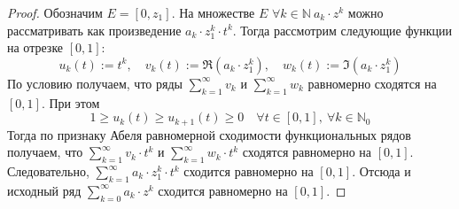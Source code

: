 \documentclass[11pt]{article}
\begin{document}
\begin{proof}
    Обозначим $E = [0, z_1]$. На множестве $E$ $\forall k \in \mathbb{N} \ a_k \cdot z^k$ можно рассматривать как произведение $a_k \cdot z_1^k \cdot t^k$. Тогда рассмотрим 
    следующие функции на отрезке $[0, 1]$: \[u_k(t) := t^k, \quad v_k(t) := \Re (a_k \cdot z_1^k), \quad w_k(t) := \Im (a_k \cdot z_1^k)\]
    По условию получаем, что ряды $\displaystyle \sum_{k = 1}^{\infty} v_k$ и $\displaystyle \sum_{k = 1}^{\infty} w_k$ равномерно сходятся на $[0, 1]$. При этом \[1 \geq u_k(t)
    \geq u_{k+1}(t) \geq 0 \quad \forall t \in [0, 1], \ \forall k \in \mathbb{N}_0\]
    Тогда по признаку Абеля равномерной сходимости функциональных рядов получаем, что $\displaystyle \sum_{k = 1}^{\infty} v_k \cdot t^k$ и $\displaystyle 
    \sum_{k = 1}^{\infty} w_k \cdot t^k$ сходятся равномерно на $[0, 1]$. Следовательно, $\displaystyle \sum_{k = 1}^{\infty} a_k \cdot z_1^k \cdot t^k$ сходится равномерно на $[0, 1]$.
    Отсюда и исходный ряд $\displaystyle  \sum_{k = 0}^{\infty} a_k \cdot z^k$ сходится равномерно на $[0, 1]$.
\end{proof}
\end{document}
